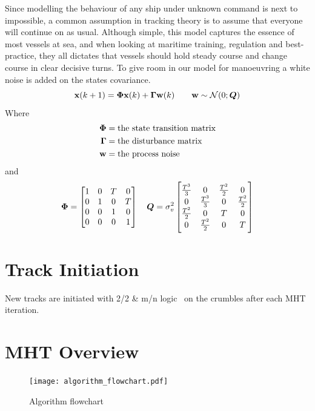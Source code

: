 Since modelling the behaviour of any ship under unknown command is next to impossible, a common assumption in tracking theory is to assume that everyone will continue on as usual. Although simple, this model captures the essence of most vessels at sea, and when looking at maritime training, regulation and best-practice, they all dictates that vessels should hold steady course and change course in clear decisive turns. To give room in our model for manoeuvring a white noise is added on the states covariance. 
\begin{equation}
\boldsymbol{\mathbf{x}}(k+1) = \bm{\Phi} \boldsymbol{\mathbf{x}}(k) + \bm{\Gamma} \boldsymbol{\mathbf{w}}(k) \qquad \boldsymbol{\mathbf{w}} \sim \mathcal{N}(0;\bm{Q})
\label{eq:motion_model}
\end{equation}
Where 
\begin{equation}
\begin{split}
\bm{\Phi} 	&= \text{the state transition matrix} \\
\bm{\Gamma}	&= \text{the disturbance matrix} \\
\boldsymbol{\mathbf{w}}		&= \text{the process noise}
\end{split}
\end{equation}
and 
\begin{equation*}
\bm{\Phi} =	\begin{bmatrix}
1 & 0 & T & 0 \\
0 & 1 & 0 & T \\
0 & 0 & 1 & 0 \\
0 & 0 & 0 & 1 \\
\end{bmatrix}
\quad
\bm{Q}	= \sigma_v^2 \begin{bmatrix}
\frac{T^3}{3} 	& 0 				& \frac{T^2}{2}	& 0 			\\
0 				& \frac{T^3}{3}  	& 0 			& \frac{T^2}{2}	\\
\frac{T^2}{2}	& 0					& T				& 0				\\
0				& \frac{T^2}{2}		& 0				& T				\\
\end{bmatrix}
\end{equation*}



\section{Track Initiation}
New tracks are initiated with 2/2 \& m/n logic~\cite{Vo2015} on the crumbles after each MHT iteration.

\section{MHT Overview}
\begin{figure}[H]
\centering
\texttt{[image: algorithm\_flowchart.pdf]}
\caption{Algorithm flowchart}\label{fig:algorithm_flow}
\end{figure}

